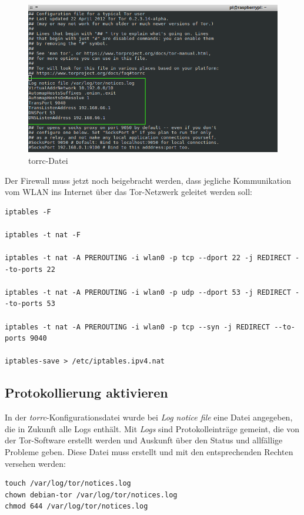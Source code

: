 \begin{figure}[H]
\centering
\includegraphics[scale=0.6]{images/torrc}
\caption{torrc-Datei}
\end{figure}
 	
Der Firewall muss jetzt noch beigebracht werden, dass jegliche Kommunikation vom WLAN ins Internet über das Tor-Netzwerk geleitet werden soll:

\begin{lstlisting}
iptables -F

iptables -t nat -F

iptables -t nat -A PREROUTING -i wlan0 -p tcp --dport 22 -j REDIRECT --to-ports 22

iptables -t nat -A PREROUTING -i wlan0 -p udp --dport 53 -j REDIRECT --to-ports 53

iptables -t nat -A PREROUTING -i wlan0 -p tcp --syn -j REDIRECT --to-ports 9040

iptables-save > /etc/iptables.ipv4.nat
\end{lstlisting}

\subsection{Protokollierung aktivieren}
In der \textit{torrc}-Konfigurationsdatei wurde bei \textit{Log notice file} eine Datei angegeben, die in Zukunft alle Logs enthält. Mit \textit{Logs} sind Protokolleinträge gemeint, die von der Tor-Software erstellt werden und Auskunft über den Status und allfällige Probleme geben. Diese Datei muss erstellt und mit den entsprechenden Rechten versehen werden:

\begin{lstlisting}
touch /var/log/tor/notices.log
chown debian-tor /var/log/tor/notices.log
chmod 644 /var/log/tor/notices.log
\end{lstlisting}

